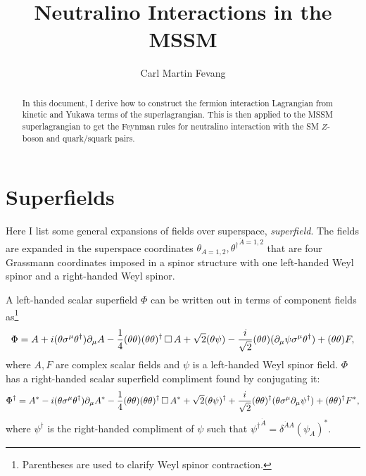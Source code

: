 \documentclass[english, notitlepage]{article}
\title{Neutralino Interactions in the MSSM}
\author{Carl Martin Fevang}
\begin{document}
\maketitle

\begin{abstract}
    \noindent
    In this document, I derive how to construct the fermion interaction
    Lagrangian from kinetic and Yukawa terms of the superlagrangian.
    This is then applied to the MSSM superlagrangian to get the Feynman rules
    for neutralino interaction with the SM \(Z\)-boson and quark/squark pairs.
\end{abstract}

\section{Superfields}
Here I list some general expansions of fields over superspace,
\textit{superfield}. The fields are expanded in the superspace coordinates
\(\theta_{A=1,2}, {\theta^\dagger}^{\dot{A}=1,2}\) that are four Grassmann
coordinates imposed in a spinor structure with one left-handed Weyl spinor and
a right-handed Weyl spinor.

A left-handed scalar superfield \(\Phi\) can be written out in terms of
component
fields as\footnote{Parentheses are used to clarify Weyl spinor contraction.}
\begin{align}
    \Phi = A + i(\theta\sigma^\mu\theta^\dagger) \partial_\mu A - \frac{1}{4}
    (\theta\theta)(\theta\theta)^\dagger \operatorname{\Box} A +
    \sqrt{2} (\theta\psi) - \frac{i}{\sqrt{2}} (\theta\theta) (\partial_\mu
    \psi \sigma^\mu \theta^\dagger) + (\theta\theta) F,
\end{align}
where \(A, F\) are complex scalar fields and \(\psi\) is a left-handed Weyl
spinor
field.
\(\Phi\) has a right-handed scalar superfield compliment found by conjugating
it:
\begin{align}
    \Phi^\dag = A^\ast - i(\theta\sigma^\mu\theta^\dagger) \partial_\mu A^\ast
    - \frac{1}{4} (\theta\theta)(\theta\theta)^\dagger \operatorname{\Box} A^\ast +
    \sqrt{2} (\theta\psi)^\dagger + \frac{i}{\sqrt{2}} (\theta\theta)^\dagger
    (\theta \sigma^\mu \partial_\mu \psi^\dagger) + (\theta\theta)^\dagger
    F^\ast,
\end{align}
where \(\psi^\dagger\) is the right-handed compliment of \(\psi\) such that
\({\psi^\dagger}^{\dot A} = \delta^{\dot A A} {(\psi_A)}^\ast.\)
\end{document}
